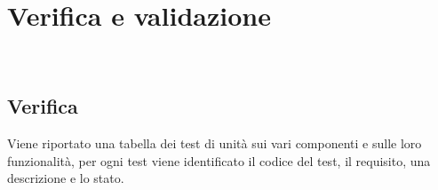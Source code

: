 
\chapter{Verifica e validazione}
\label{cap:verifica}

\\

\section{Verifica}
Viene riportato una tabella dei test di unità sui vari componenti e sulle loro funzionalità, per ogni test viene identificato il codice del test, il requisito, una descrizione e lo stato.

